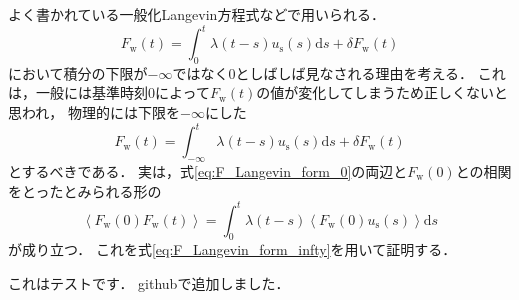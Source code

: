 \documentclass[10pt, dvipdfmx]{jarticle}
\newcommand{\la}{\left <}
\newcommand{\ra}{\right >}
\begin{document}
よく書かれている一般化Langevin方程式などで用いられる．
\begin{equation}\label{eq:F_Langevin_form_0}
    F_\text{w}(t) = \int_0^t \lambda(t-s) u_\text{s}(s) \text{d} s + \delta F_\text{w}(t)
\end{equation}
において積分の下限が$-\infty$ではなく$0$としばしば見なされる理由を考える．
これは，一般には基準時刻$0$によって$F_\text{w}(t)$の値が変化してしまうため正しくないと思われ，
物理的には下限を$-\infty$にした
\begin{equation}\label{eq:F_Langevin_form_infty}
    F_\text{w}(t) = \int_{-\infty}^t \lambda(t-s) u_\text{s}(s) \text{d} s + \delta F_\text{w}(t)
\end{equation}
とするべきである．
実は，式\eqref{eq:F_Langevin_form_0}の両辺と$F_\text{w}(0)$との相関をとったとみられる形の
\begin{equation}\label{eq:F_cor_Langevin_form_0}
    \la F_\text{w}(0) F_\text{w}(t) \ra = \int_0^t \lambda(t-s) \la F_\text{w}(0) u_\text{s}(s) \ra \text{d} s
\end{equation}
が成り立つ．
これを式\eqref{eq:F_Langevin_form_infty}を用いて証明する．

これはテストです．
githubで追加しました．
\end{document}
